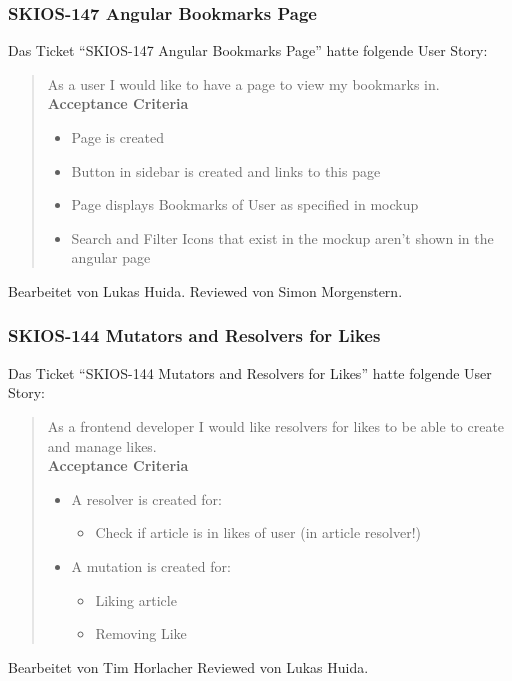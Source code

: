 \subsubsection{SKIOS-147 Angular Bookmarks Page} \label{story:147}
Das Ticket \enquote{SKIOS-147 Angular Bookmarks Page} hatte folgende User Story:
\begin{quotation}
    As a user I would like to have a page to view my bookmarks in. \\
\textbf{Acceptance Criteria}
\begin{itemize}
    \item Page is created
    \item Button in sidebar is created and links to this page
    \item Page displays Bookmarks of User as specified in mockup
    \item Search and Filter Icons that exist in the mockup aren't shown in the angular page
\end{itemize}
\end{quotation}
Bearbeitet von Lukas Huida.
Reviewed von Simon Morgenstern.

\subsubsection{SKIOS-144 Mutators and Resolvers for Likes}
Das Ticket \enquote{SKIOS-144 Mutators and Resolvers for Likes} hatte folgende User Story:
\begin{quotation}
    As a frontend developer I would like resolvers for likes to be able to create and manage likes. \\
\textbf{Acceptance Criteria}
\begin{itemize}
    \item A resolver is created for:
    \begin{itemize}
        \item Check if article is in likes of user (in article resolver!)
    \end{itemize}
    \item A mutation is created for:
    \begin{itemize}
        \item Liking article
        \item Removing Like
    \end{itemize}
\end{itemize}
\end{quotation}
Bearbeitet von Tim Horlacher
Reviewed von Lukas Huida.

